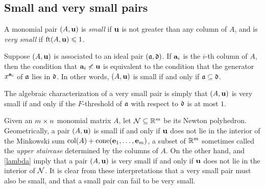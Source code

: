 \documentclass{amsart}
\begin{document}
\subsection{Small and very small pairs}

\begin{definition}
A monomial pair $(A, \mathbf{u})$ is \emph{small} if $\mathbf{u}$ is not greater than any column of $A$, and is \emph{very small} if $\operatorname{ft}(A, \mathbf{u}) \leqslant 1$.
\end{definition}

\begin{remark}
\label{algebraic small and very small: R}
  Suppose $(A, \mathbf{u})$ is associated to an ideal pair $(\mathfrak{a}, \mathfrak{d})$.  If $\mathbf{a}_i$ is the $i$-th column of $A$, then the condition that $\mathbf{a}_i \not < \mathbf{u}$ is equivalent to the condition that the generator $x^{\mathbf{a}_i}$ of $\mathfrak{a}$ lies in $\mathfrak{d}$.  In other words, $(A, \mathbf{u})$ is small if and only if $\mathfrak{a} \subseteq \mathfrak{d}$.

The algebraic characterization of a very small pair is simply that $(A, \mathbf{u})$ is very small if and only if the $F$-threshold of $\mathfrak{a}$ with respect to $\mathfrak{d}$ is at most $1$.
\end{remark}

\begin{remark}
\label{geometric small and very small: R}
Given an $m \times n$ monomial matrix $A$, let $\mathcal{N} \subseteq \mathbb{R}^{m}$ be its Newton polyhedron.
Geometrically, a pair $(A, \mathbf{u})$ is small if and only if $\mathbf{u}$ does not lie in the interior of the Minkowski sum $\operatorname{col}(A) + \operatorname{cone}(\mathbf{e}_1,\ldots,\mathbf{e}_m)$, a subset of $\mathbb{R}^{m}$ sometimes called the \emph{upper staircase} determined by the columns of $A$.
On the other hand,  and \ref{lambda} imply that a pair $(A, \mathbf{u})$ is very small if and only if $\mathbf{u}$ does not lie in the interior of $\mathcal{N}$.
It is clear from these interpretations that a very small pair must also be small, and that a small pair can fail to be very small.
\end{remark}
\end{document}

